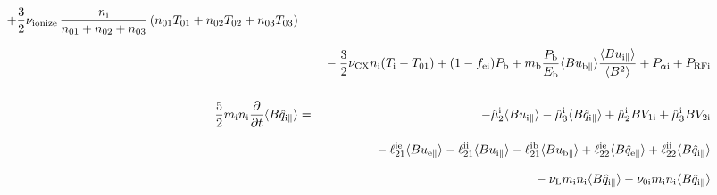 \documentclass[11pt]{article}
\def\r#1{{\rm#1}}
\def\aves#1{\langle#1\rangle}
\def\para{\parallel}
\def\mi{m_\r{i}}
\def\mb{m_\r{b}}
\def\ni{n_\r{i}}
\def\nna{n_{01}}
\def\nnb{n_{02}}
\def\nnc{n_{03}}
\def\Ti{T_\r{i}}
\def\Pb{P_\r{b}}
\def\Eb{E_\r{b}}
\def\uepara{u_{\r{e}\para}}
\def\uipara{u_{\r{i}\para}}
\def\ubpara{u_{\r{b}\para}}
\def\qipara{q_{\r{i}\para}}
\def\qhatepara{\hat{q}_{\r{e}\para}}
\def\qhatipara{\hat{q}_{\r{i}\para}}
\def\ddt{\frac{\partial}{\partial t}}
\def\PRFi{P_\r{RFi}}
\def\Tna{T_{01}}
\def\Tnb{T_{02}}
\def\Tnc{T_{03}}
\def\fei{f_\r{ei}}
\def\Palpi{P_{\alpha\r{i}}}
\def\nuni{\nu_\r{0i}}
\def\nuL{\nu_\r{L}}
\def\nuCX{\nu_\r{CX}}
\def\nuion{\nu_\r{ionize}}
\begin{document}
\begin{eqnarray}
  + \frac{3}{2} \nuion\, \frac{\ni}{\nna + \nnb + \nnc}\, (\nna \Tna +
  \nnb \Tnb + \nnc \Tnc)
\nonumber\\[2.5mm]&&{}
%
  - \frac{3}{2} \nuCX \ni (\Ti - \Tna)
%
  + (1 - \fei) \Pb
%
  + \mb \frac{\Pb}{\Eb} \aves{B \ubpara} \frac{\aves{B \uipara}}{\aves{B^2}}
%
  + \Palpi
%
  + \PRFi
\\[5mm]
 \frac{5}{2} \mi \ni \ddt \aves{B \qhatipara} &=&
%
  - \hat{\mu}_2^\r{i} \aves{B \uipara} 
  - \hat{\mu}_3^\r{i} \aves{B \qhatipara}
%
  + \hat{\mu}_2^\r{i} {B V_{1\r{i}}} 
  + \hat{\mu}_3^\r{i} {B V_{2\r{i}}}
\nonumber\\[3mm]&&{}
%
  - \ell_{21}^{\r{ie}} \aves{B \uepara}
  - \ell_{21}^{\r{ii}} \aves{B \uipara}
  - \ell_{21}^{\r{ib}} \aves{B \ubpara}
%
  + \ell_{22}^{\r{ie}} \aves{B \qhatepara}
  + \ell_{22}^{\r{ii}} \aves{B \qhatipara}
\nonumber\\[3mm]&&{}
%
  - \nuL \mi \ni \aves{B \qhatipara}
%
  - \nuni \mi \ni \aves{B \qhatipara}
\end{eqnarray}
%
\end{document}
